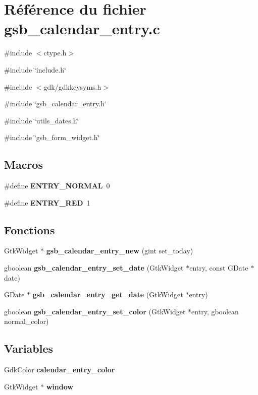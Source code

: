 \section{Référence du fichier gsb\_\-calendar\_\-entry.c}
\label{gsb__calendar__entry_8c}
{\ttfamily \#include $<$ctype.h$>$}\par
{\ttfamily \#include \char`\"{}include.h\char`\"{}}\par
{\ttfamily \#include $<$gdk/gdkkeysyms.h$>$}\par
{\ttfamily \#include \char`\"{}gsb\_\-calendar\_\-entry.h\char`\"{}}\par
{\ttfamily \#include \char`\"{}utils\_\-dates.h\char`\"{}}\par
{\ttfamily \#include \char`\"{}gsb\_\-form\_\-widget.h\char`\"{}}\par
\subsection*{Macros}
\begin{DoxyCompactItemize}
\item 
\#define {\bf ENTRY\_\-NORMAL}~0
\item 
\#define {\bf ENTRY\_\-RED}~1
\end{DoxyCompactItemize}
\subsection*{Fonctions}
\begin{DoxyCompactItemize}
\item 
GtkWidget $\ast$ {\bf gsb\_\-calendar\_\-entry\_\-new} (gint set\_\-today)
\item 
gboolean {\bf gsb\_\-calendar\_\-entry\_\-set\_\-date} (GtkWidget $\ast$entry, const GDate $\ast$date)
\item 
GDate $\ast$ {\bf gsb\_\-calendar\_\-entry\_\-get\_\-date} (GtkWidget $\ast$entry)
\item 
gboolean {\bf gsb\_\-calendar\_\-entry\_\-set\_\-color} (GtkWidget $\ast$entry, gboolean normal\_\-color)
\end{DoxyCompactItemize}
\subsection*{Variables}
\begin{DoxyCompactItemize}
\item 
GdkColor {\bf calendar\_\-entry\_\-color}
\item 
GtkWidget $\ast$ {\bf window}
\end{DoxyCompactItemize}


